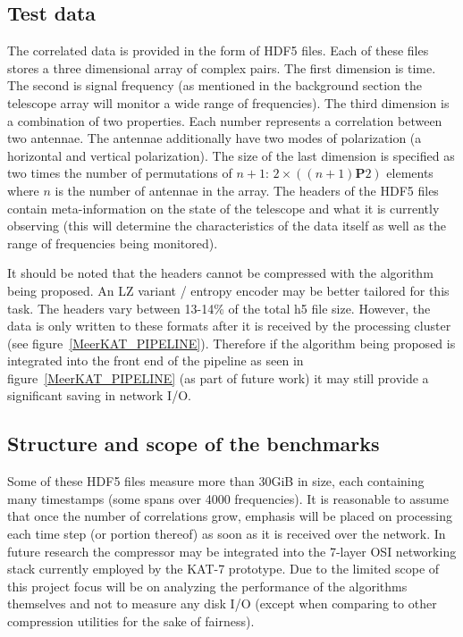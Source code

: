\subsection{Test data}
The correlated data is provided in the form of HDF5 files. Each of these files stores a three dimensional array of complex pairs. The first dimension is time. The second 
is signal frequency (as mentioned in the background section the telescope array will monitor a wide range of frequencies). The third dimension is a combination of two 
properties. Each number represents a correlation between two antennae. The antennae additionally have two modes of polarization (a horizontal and vertical polarization). 
The size of the last dimension is specified as two times the number of permutations of $n + 1$: $2\times((n+1)\mathbf{P}2)$ elements where $n$ is the number of
antennae in the array. The headers of the HDF5 files contain meta-information on the state of the telescope and what it is currently observing (this will determine the 
characteristics of the data itself as well as the range of frequencies being monitored). 

It should be noted that the headers cannot be compressed with the algorithm being proposed. An LZ variant / entropy encoder may be better tailored for this task. 
The headers vary between 13-14\% of the total h5 file size. However, the data is only written to these formats after it is received by the processing cluster (see 
figure~\ref{MeerKAT_PIPELINE}). Therefore if the algorithm being proposed is integrated into the front end of the pipeline as seen in figure~\ref{MeerKAT_PIPELINE} (as part of 
future work) it may still provide a significant saving in network I/O. 
\subsection{Structure and scope of the benchmarks}
Some of these HDF5 files measure more than 30GiB in size, each containing many timestamps (some spans over 4000 frequencies). It is reasonable to assume that once the number of correlations grow, emphasis will be placed on processing each 
time step (or portion thereof) as soon as it is received over the network. In future research the compressor may be integrated into the 7-layer OSI networking stack currently employed by the KAT-7 prototype. Due to the limited
scope of this project focus will be on analyzing the performance of the algorithms themselves and not to measure any disk I/O (except when comparing to other compression utilities for the sake of fairness).

